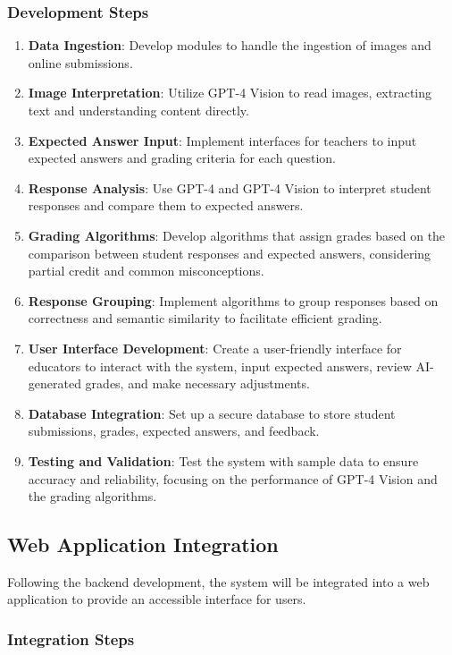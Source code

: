 \documentclass[ms,twoside,print]{nuthesis}
\begin{document}
\subsubsection{Development Steps}

\begin{enumerate}
    \item \textbf{Data Ingestion}: Develop modules to handle the ingestion of images and online submissions.
    \item \textbf{Image Interpretation}: Utilize GPT-4 Vision to read images, extracting text and understanding content directly.
    \item \textbf{Expected Answer Input}: Implement interfaces for teachers to input expected answers and grading criteria for each question.
    \item \textbf{Response Analysis}: Use GPT-4 and GPT-4 Vision to interpret student responses and compare them to expected answers.
    \item \textbf{Grading Algorithms}: Develop algorithms that assign grades based on the comparison between student responses and expected answers, considering partial credit and common misconceptions.
    \item \textbf{Response Grouping}: Implement algorithms to group responses based on correctness and semantic similarity to facilitate efficient grading.
    \item \textbf{User Interface Development}: Create a user-friendly interface for educators to interact with the system, input expected answers, review AI-generated grades, and make necessary adjustments.
    \item \textbf{Database Integration}: Set up a secure database to store student submissions, grades, expected answers, and feedback.
    \item \textbf{Testing and Validation}: Test the system with sample data to ensure accuracy and reliability, focusing on the performance of GPT-4 Vision and the grading algorithms.
\end{enumerate}

\subsection{Web Application Integration}

Following the backend development, the system will be integrated into a web application to provide an accessible interface for users.

\subsubsection{Integration Steps}
\end{document}

